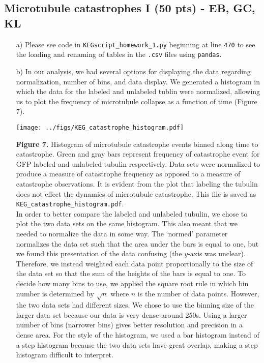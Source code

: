 \subsection{Microtubule catastrophes I (50 pts) - EB, GC, KL}
\begin{itemize}
	\item[a)] Please see code in \texttt{KEGscript\_homework\_1.py}
		beginning at line 
		\texttt{470} to see the loading and renaming of tables in the
		\texttt{.csv} files using \texttt{pandas}.
	\item[b)] In our analysis, we had several options for displaying 
		the data regarding normalization, number of bins, and data
		display. We generated a histogram in which the data for
		the labeled and unlabeled tublin were normalized, allowing us
		to plot the frequency of microtubule collapse as a function of
		time (Figure 7).

		\begin{center}
			\texttt{[image: ../figs/KEG\_catastrophe\_histogram.pdf]}
		\end{center}
			{\small \textbf{Figure 7.} Histogram of microtubule
			catastrophe events binned along time to
			catastrophe. Green and gray bars represent frequency
			of catastrophe event for GFP labeled and unlabeled
			tubulin respectively. Data sets were normalized to
			produce a measure of catastrophe frequency as opposed to a
			measure of catastrophe observations. It is evident from the plot that
			labeling the tubulin does not effect the dynamics of
		microtubule catastrophe. This file is saved as
		\texttt{KEG\_catastrophe\_histogram.pdf}.}\\


		In order to better compare the labeled and unlabeled tubulin,
		we chose to plot the two data sets on the same histogram. This
		also meant that we needed to normalize the data in some way.
		The ‘normed’ parameter normalizes the data set such that the
		area under the bars is equal to one, but we found this
		presentation of the data confusing (the $y$-axis was unclear).
		Therefore, we instead weighted each data point proportionally
		to the size of the data set so that the sum of the heights of
		the bars is equal to one. To decide how many bins to use,
		we applied the square root rule in which bin number is
		determined by $\sqrt{n}$ where $n$ is the number of data
		points. However, the two data sets
		had different sizes. We chose to use the binning size of the
		larger data set because our data is very dense around 250s. Using a
		larger number of bins (narrower bins) gives better resolution
		and precision in a dense area. For the style of the histogram,
		we used a bar histogram instead of a step histogram because
		the two data sets have great overlap, making a step histogram
		difficult to interpret.


\end{itemize}
